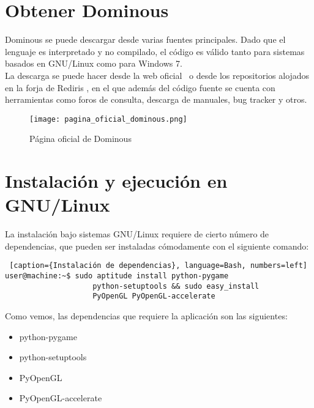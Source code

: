 

\section{Obtener Dominous}

Dominous se puede descargar desde varias fuentes principales. Dado que el lenguaje es interpretado y no compilado, el código
es válido tanto para sistemas basados en GNU/Linux como para Windows 7. \\

La descarga se puede hacer desde la web oficial~\cite{website:dominous} o desde los repositorios alojados en la 
forja de Rediris , en el que además del código fuente se cuenta con
herramientas como foros de consulta, descarga de manuales, bug tracker y otros.

\begin{figure}[h]
  \begin{center}
    \texttt{[image: pagina\_oficial\_dominous.png]}
  \end{center}
  \caption{Página oficial de Dominous}
  \label{fig:pagina_oficial_dominous}
\end{figure}

\section{Instalación y ejecución en GNU/Linux}

La instalación bajo sistemas GNU/Linux requiere de cierto número de dependencias, que pueden ser instaladas cómodamente
con el siguiente comando:

\begin{lstlisting} [caption={Instalación de dependencias}, language=Bash, numbers=left]
user@machine:~$ sudo aptitude install python-pygame
                    python-setuptools && sudo easy_install
                    PyOpenGL PyOpenGL-accelerate
\end{lstlisting}

Como vemos, las dependencias que requiere la aplicación son las siguientes:

\begin{itemize}
    \item python-pygame
    \item python-setuptools
    \item PyOpenGL
    \item PyOpenGL-accelerate
\end{itemize}

